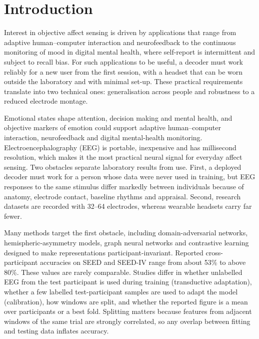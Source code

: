\section{Introduction}
Interest in objective affect sensing is driven by applications that range from adaptive human–computer interaction and neurofeedback to the continuous monitoring of mood in digital mental health, where self-report is intermittent and subject to recall bias. For such applications to be useful, a decoder must work reliably for a new user from the first session, with a headset that can be worn outside the laboratory and with minimal set-up. These practical requirements translate into two technical ones: generalisation across people and robustness to a reduced electrode montage.

Emotional states shape attention, decision making and mental health, and objective markers of emotion could support adaptive human–computer interaction, neurofeedback and digital mental-health monitoring\cite{russell,seediv}. Electroencephalography (EEG) is portable, inexpensive and has millisecond resolution, which makes it the most practical neural signal for everyday affect sensing\cite{seed,deap}. Two obstacles separate laboratory results from use. First, a deployed decoder must work for a person whose data were never used in training, but EEG responses to the same stimulus differ markedly between individuals because of anatomy, electrode contact, baseline rhythms and appraisal\cite{clisa,ganin,dan}. Second, research datasets are recorded with 32–64 electrodes, whereas wearable headsets carry far fewer.

Many methods target the first obstacle, including domain-adversarial networks\cite{ganin,bidann}, hemispheric-asymmetry models\cite{bihdm}, graph neural networks\cite{dgcnn,rgnn,sognn} and contrastive learning designed to make representations participant-invariant\cite{clisa}. Reported cross-participant accuracies on SEED and SEED-IV range from about 53\% to above 80\%\cite{dgcnn,dan,bidann,bihdm,rgnn,sognn,bfenet,attgraph,ssemerge}. These values are rarely comparable. Studies differ in whether unlabelled EEG from the test participant is used during training (transductive adaptation), whether a few labelled test-participant samples are used to adapt the model (calibration), how windows are split, and whether the reported figure is a mean over participants or a best fold. Splitting matters because features from adjacent windows of the same trial are strongly correlated, so any overlap between fitting and testing data inflates accuracy\cite{saeb,kapoor,liblock}.

